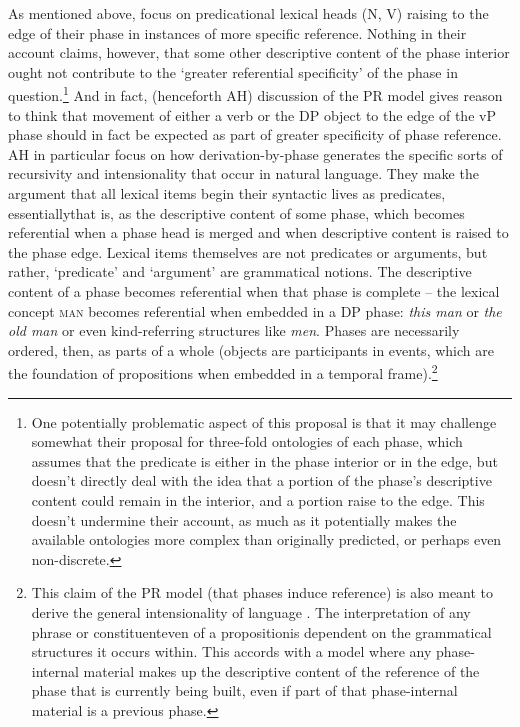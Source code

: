 \documentclass[output=paper
,modfonts
,nonflat
]{langsci/langscibook}
\begin{document}
As mentioned above, \citet{SheehanHinzen:2011} focus on predicational lexical heads (N, V) raising to the edge of their phase in instances of more specific reference. Nothing in their account claims, however, that some other descriptive content of the phase interior ought not contribute to the `greater referential specificity' of the phase in question.\footnote{One potentially problematic aspect of this proposal is that it may challenge somewhat their proposal for three-fold ontologies of each phase, which assumes that the predicate is either in the phase interior or in the edge, but doesn’t directly deal with the idea that a portion of the phase's descriptive content could remain in the interior, and a portion raise to the edge. This doesn’t undermine their account, as much as it potentially makes the available ontologies more complex than originally predicted, or perhaps even non-discrete.}  And in fact, \citet{ArsenijevicHinzen:2012} (henceforth AH) discussion of the PR model gives reason to think that movement of either a verb or the DP object to the edge of the vP phase should in fact be expected as part of greater specificity of phase reference. AH in particular focus on how derivation-by-phase generates the specific sorts of recursivity and intensionality that occur in natural language. They make the argument that all lexical items begin their syntactic lives as predicates, essentially\textemdash that is, as the descriptive content of some phase, which becomes referential when a phase head is merged and when descriptive content is raised to the phase edge. Lexical items themselves are not predicates or arguments, but rather, `predicate' and `argument' are grammatical notions. The descriptive content of a phase becomes referential when that phase is complete – the lexical concept \textsc{man} becomes referential when embedded in a DP phase: \textit{this man} or \textit{the old man} or even kind-referring structures like \textit{men}. Phases are necessarily ordered, then, as parts of a whole (objects are participants in events, which are the foundation of propositions when embedded in a temporal frame).\footnote{This claim of the PR model (that phases induce reference) is also meant to derive the general intensionality of language \citep{Hinzen:2014b,ArsenijevicHinzen:2012,HinzenSheehan:2013}. The interpretation of any phrase or constituent\textemdash even of a proposition\textemdash is dependent on the grammatical structures it occurs within. This accords with a model where any phase-internal material makes up the descriptive content of the reference of the phase that is currently being built, even if part of that phase-internal material is a previous phase.} 
\end{document}
